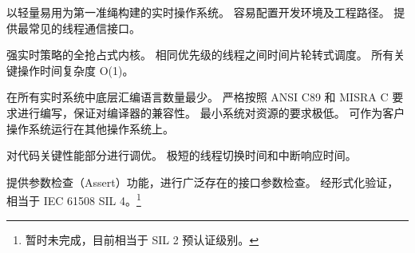 \begin{description}[leftmargin=0pt,labelindent=0pt,style=nextline,itemsep=8pt]
    \item[\textsf{\color{rmppurple}高易用性}]
    以轻量易用为第一准绳构建的实时操作系统。
    容易配置开发环境及工程路径。
    提供最常见的线程通信接口。

    \item[\textsf{\color{rmppurple}高实时性}]
    强实时策略的全抢占式内核。
    相同优先级的线程之间时间片轮转式调度。
    所有关键操作时间复杂度 O(1)。

    \item[\textsf{\color{rmppurple}高可移植性}]
    在所有实时系统中底层汇编语言数量最少。
    严格按照 ANSI C89 和 MISRA C 要求进行编写，保证对编译器的兼容性。
    最小系统对资源的要求极低。
    可作为客户操作系统运行在其他操作系统上。

    \item[\textsf{\color{rmppurple}高执行效率}]
    对代码关键性能部分进行调优。
    极短的线程切换时间和中断响应时间。

    \item[\textsf{\color{rmppurple}高可靠性}]
    提供参数检查（Assert）功能，进行广泛存在的接口参数检查。
    经形式化验证，相当于 IEC 61508 SIL 4。\footnote{暂时未完成，目前相当于 SIL 2 预认证级别。}
\end{description}

\newcommand{\RMPRevisionHistory}{%
\chapter*{版本历史}
\addcontentsline{toc}{chapter}{版本历史}
\markboth{版本历史}{}

\begin{table}[htbp]
    \centering
    \renewcommand{\arraystretch}{1.25}
    \small
    \begin{tabularx}{\textwidth}{@{}>{\sffamily\bfseries\color{rmppurple}}m{1.8cm}
                                  >{\raggedright\arraybackslash}m{3.2cm}X@{}}
    \toprule
    版本 & 日期（年-月-日） & 说明 \\
    \midrule
    R1T1 & 2018-02-15 & 初始发布。 \\
    R2T1 & 2018-03-12 & 增加了移植说明和附录。 \\
    R4T3 & 2018-07-31 & 修正手册的错误。 \\
    R4T3 & 2018-09-01 & 更新手册到新版本。 \\
    R4T4 & 2018-10-10 & 解除内存管理单元的 128\,MB 限制，使用更优化的圆角矩形绘制算法。 \\
    R4T5 & 2018-11-25 & 解除最大优先级个数的限制，允许更激进的内存用量优化策略。 \\
    R5T1 & 2020-03-01 & 在基本接口之外增加额外的线程通信接口。 \\
    R5T2 & 2023-05-07 & 为信号量增加广播和同步解锁模式。 \\
    R6T1 & 2024-06-26 & 调整钩子宏的位置和声明，调整 GUI 的配置宏规则。 \\
    \bottomrule
    \end{tabularx}
\end{table}
}
